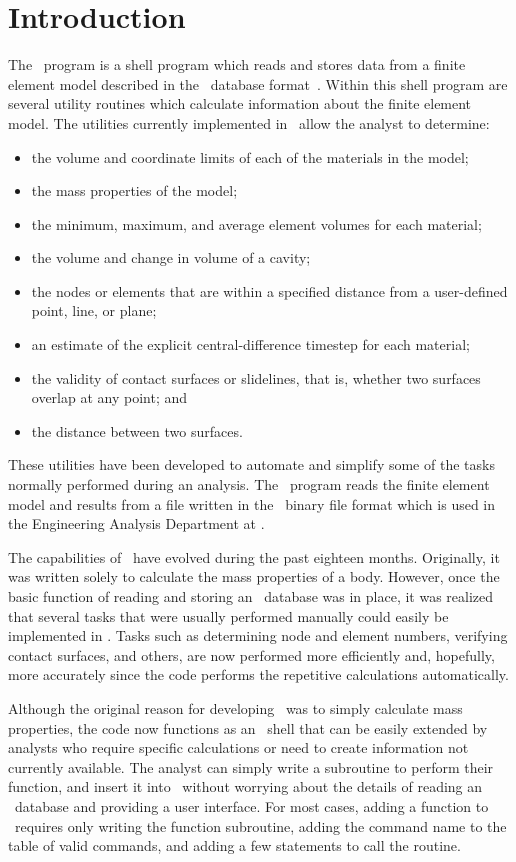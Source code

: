 \chapter{Introduction}

The \numbers\ program is a shell program which reads and stores data
from a finite element model described in the \exo\ database
format~\cite{EXODUS}.
Within this shell program are several utility routines which calculate
information about the finite element model.  The utilities currently
implemented in \numbers\ allow the analyst to determine:
\begin{itemize}
\item the volume and coordinate limits of each of the materials in the model;
\item the mass properties of the model;
\item the minimum, maximum, and average element volumes for each material;
\item the volume and change in volume of a cavity;
\item the nodes or elements that are within a specified distance from a
user-defined point, line, or plane;
\item an estimate of the explicit central-difference timestep for each
material;
\item the validity of contact surfaces or slidelines, that is, whether
two surfaces overlap at any point; and
\item the distance between two surfaces.
\end{itemize}

These utilities have been developed to automate and simplify some of the
tasks normally performed during an analysis.  The \numbers\ program
reads the finite element model and results from a file written in the
\exo\ binary file format which is used in the Engineering
Analysis Department at \SNLA.

The capabilities of \numbers\ have evolved during the past eighteen
months.  Originally, it was written solely to calculate the mass
properties of a body.  However, once the basic function of reading and
storing an \exo\ database was in place, it was realized that several
tasks that were usually performed manually could easily be implemented
in \numbers.  Tasks such as determining node and element numbers,
verifying contact surfaces, and others, are now performed more
efficiently and, hopefully, more accurately since the code performs the
repetitive calculations automatically.

Although the original reason for developing \numbers\ was to simply
calculate mass properties, the code now functions as an \exo\ shell that
can be easily extended by analysts who require specific calculations or
need to create information not currently available.  The analyst can
simply write a subroutine to perform their function, and insert it into
\numbers\ without worrying about the details of reading an \exo\
database and providing a user interface. For most cases, adding a
function to \numbers\ requires only writing the function subroutine,
adding the command name to the table of valid commands, and adding a few
statements to call the routine.

